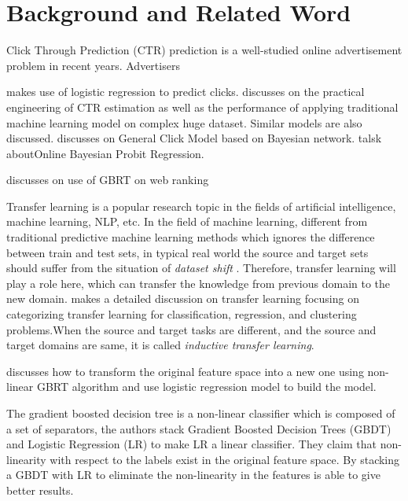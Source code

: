 \chapter{Background and Related Word}
\label{chapterlabel2}

Click Through Prediction (CTR) prediction is a well-studied online advertisement problem in recent years. Advertisers 



 \cite{richardson2007predicting} makes use of logistic regression to predict clicks. \cite{mcmahan2013ad} discusses on the practical engineering of CTR estimation as well as the performance of applying traditional machine learning model on complex huge dataset. Similar models are also discussed. \cite{zhu2010novel} discusses on General Click Model based on Bayesian network. \cite{graepel2010web} talsk aboutOnline Bayesian Probit Regression. 


\cite{mohan2011web} discusses on use of GBRT on web ranking


Transfer learning is a popular research topic in the fields of artificial intelligence, machine learning, NLP, etc. In the field of machine learning, different from traditional predictive machine learning methods which ignores the difference between train and test sets, in typical real world the source and target sets should suffer from the situation of \textit{dataset shift} \cite{quionero2009dataset}. Therefore, transfer learning will play a role here, which can transfer the knowledge from previous domain to the new domain. \cite{pan2010survey} makes a detailed discussion on transfer learning focusing on categorizing transfer learning for classification, regression, and clustering problems.When the source and target tasks are different, and the source and target domains are same, it is called \textit{inductive transfer learning}.

\cite{he2014practical} discusses how to transform the original feature space into a new one using non-linear GBRT algorithm and use logistic regression model to build the model. 

The gradient boosted decision tree is a non-linear classifier which is composed of a set of separators, the authors stack Gradient Boosted Decision Trees (GBDT) and Logistic Regression (LR) to make LR a linear classifier. They claim that non-linearity with respect to the labels exist in the original feature space. By stacking a GBDT with LR to eliminate the non-linearity in the features is able to give better results.

